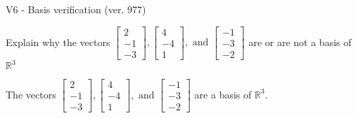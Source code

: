 \begin{exercise}
  \begin{exerciseTitle}V6 - Basis verification (ver. 977)\end{exerciseTitle}
  \begin{exerciseStatement}
    Explain why the vectors \(\left[\begin{array}{r}
2 \\
-1 \\
-3
\end{array}\right] , \left[\begin{array}{r}
4 \\
-4 \\
1
\end{array}\right] , \text{ and } \left[\begin{array}{r}
-1 \\
-3 \\
-2
\end{array}\right]\) are or are not a basis of \(\mathbb{R}^3\)	


  \end{exerciseStatement}
  \begin{exerciseAnswer}
   The vectors \(\left[\begin{array}{r}
2 \\
-1 \\
-3
\end{array}\right] , \left[\begin{array}{r}
4 \\
-4 \\
1
\end{array}\right] , \text{ and } \left[\begin{array}{r}
-1 \\
-3 \\
-2
\end{array}\right]\) 
  	 are  a basis of \(\mathbb{R}^3\).
  


  \end{exerciseAnswer}
\end{exercise}